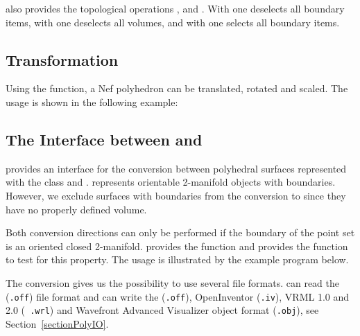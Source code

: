  also provides the topological operations
,  and . With
 one deselects all boundary items, with
 one deselects all volumes, and with 
one selects all boundary items.


\subsection{Transformation}

Using the  function, a Nef polyhedron can be translated, 
rotated and scaled. The usage is shown in the following example:


\subsection{The Interface between  and 
    }
\label{sectionNef_3Polyhedron}

 provides an interface for the conversion between
polyhedral surfaces represented with the  class
and .   represents orientable
2-manifold objects with boundaries. However, we exclude surfaces with
boundaries from the conversion to  since they
have no properly defined volume.

Both conversion directions can only be performed if the boundary of
the point set is an oriented closed 2-manifold.
 provides the function  and
 provides the function  to test for
this property. The usage is illustrated by the example program below.

The conversion gives us the possibility to use several file formats.
 can read the ({\tt .off}) file format and can write
the ({\tt .off}), OpenInventor ({\tt .iv}), VRML 1.0 and 2.0 ({\tt
  .wrl}) and Wavefront Advanced Visualizer object format ({\tt .obj}),
see Section~\ref{sectionPolyIO}.


